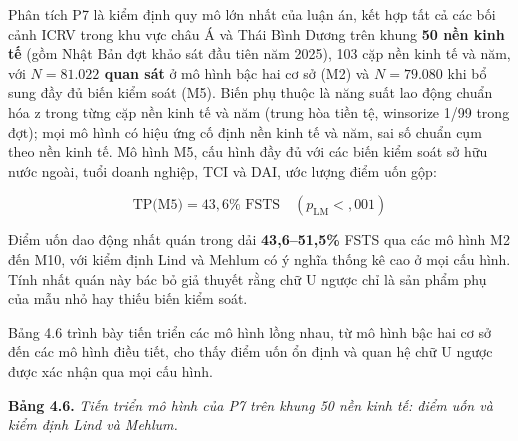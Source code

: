 \documentclass[
  a4paper,
  13pt]{extreport}
\begin{document}
Phân tích P7 là kiểm định quy mô lớn nhất của luận án, kết hợp tất cả
các bối cảnh ICRV trong khu vực châu Á và Thái Bình Dương trên khung
\textbf{50 nền kinh tế} (gồm Nhật Bản đợt khảo sát đầu tiên năm 2025),
103 cặp nền kinh tế và năm, với \textbf{\(N = 81.022\) quan sát} ở mô
hình bậc hai cơ sở (M2) và \(N = 79.080\) khi bổ sung đầy đủ biến kiểm
soát (M5). Biến phụ thuộc là năng suất lao động chuẩn hóa z trong từng
cặp nền kinh tế và năm (trung hòa tiền tệ, winsorize 1/99 trong đợt);
mọi mô hình có hiệu ứng cố định nền kinh tế và năm, sai số chuẩn cụm
theo nền kinh tế. Mô hình M5, cấu hình đầy đủ với các biến kiểm soát sở
hữu nước ngoài, tuổi doanh nghiệp, TCI và DAI, ước lượng điểm uốn gộp:

\[\text{TP(M5)} = 43{,}6\% \text{ FSTS} \quad (p_{\text{LM}} < {,}001)\]

Điểm uốn dao động nhất quán trong dải \textbf{43,6--51,5\%} FSTS qua các
mô hình M2 đến M10, với kiểm định Lind và Mehlum có ý nghĩa thống kê cao
ở mọi cấu hình. Tính nhất quán này bác bỏ giả thuyết rằng chữ U ngược
chỉ là sản phẩm phụ của mẫu nhỏ hay thiếu biến kiểm soát.

Bảng 4.6 trình bày tiến triển các mô hình lồng nhau, từ mô hình bậc hai
cơ sở đến các mô hình điều tiết, cho thấy điểm uốn ổn định và quan hệ
chữ U ngược được xác nhận qua mọi cấu hình.

\textbf{Bảng 4.6.} \emph{Tiến triển mô hình của P7 trên khung 50 nền
kinh tế: điểm uốn và kiểm định Lind và Mehlum.}
\end{document}
